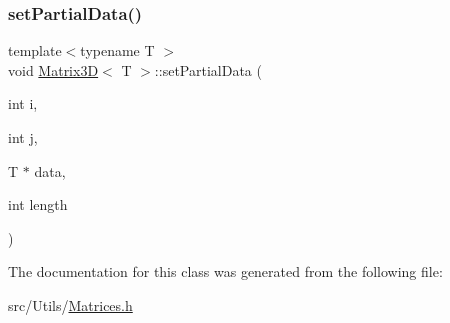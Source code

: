 \subsubsection{\texorpdfstring{set\+Partial\+Data()}{setPartialData()}}
{\footnotesize\ttfamily template$<$typename T $>$ \\
void \mbox{\hyperlink{classMatrix3D}{Matrix3D}}$<$ T $>$\+::set\+Partial\+Data (\begin{DoxyParamCaption}\item[{int}]{i,  }\item[{int}]{j,  }\item[{T $\ast$}]{data,  }\item[{int}]{length }\end{DoxyParamCaption})}



The documentation for this class was generated from the following file\+:\begin{DoxyCompactItemize}
\item 
src/\+Utils/\mbox{\hyperlink{Matrices_8h}{Matrices.\+h}}\end{DoxyCompactItemize}
